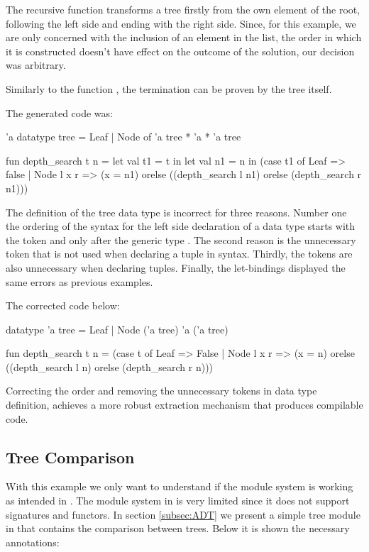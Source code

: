 The recursive function  transforms a tree firstly from the own element of the root, following the left side and 
ending with the right side. Since, for this example, we are only concerned with the inclusion of an element in the list, the order 
in which it is constructed doesn't have effect on the outcome of the solution, our decision was arbitrary.

Similarly to the function , the termination can be proven by the tree itself.

The generated \cml code was:

\begin{cakeml}
'a datatype tree = Leaf | Node of 'a tree * 'a * 'a tree

fun depth_search t n = let val t1 = t in
  let val n1 = n in
  (case t1 of
    Leaf => false
  | Node l x r =>
    (x = n1) orelse ((depth_search l n1) orelse (depth_search r n1)))
\end{cakeml}

The definition of the tree data type is incorrect for three reasons. Number one the ordering of the syntax for the left side declaration 
of a data type starts with the token  and only after the generic type . The second reason is the
unnecessary token  that is not used when declaring a tuple in \cml syntax. Thirdly, the tokens \inlinecode{*} are also
unnecessary when declaring tuples. Finally, the let-bindings displayed the same errors as previous examples.

The corrected code below:

\begin{cakeml}
datatype 'a tree = Leaf | Node ('a tree) 'a ('a tree)

fun depth_search t n =
  (case t of
    Leaf => False
  | Node l x r =>
    (x = n) orelse ((depth_search l n) orelse (depth_search r n)))
\end{cakeml}

Correcting the order and removing the unnecessary tokens in data type definition, achieves a more robust extraction mechanism that 
produces compilable \cml code.

\subsection{Tree Comparison}

With this example we only want to understand if the module system is working as intended in \cml. The module system in \cml is very 
limited since it does not support signatures and functors. In section \ref{subsec:ADT} we present a simple tree module in \ocaml that 
contains the comparison between trees. Below it is shown the necessary \gospel annotations:

